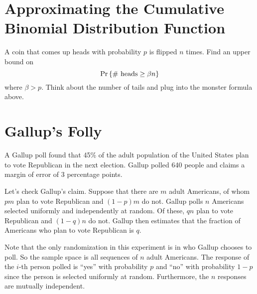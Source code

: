 \documentclass[12pt]{article}
\begin{document}
\vspace{0.5in}

\section{Approximating the Cumulative Binomial Distribution Function}
A coin that comes up heads with probability $p$ is flipped $n$ times.
Find an upper bound on
%
\[
\mathop{\textup{Pr}}\nolimits\left\{\text{\# heads} \geq \beta n\right\}
\]
%
where $\beta > p$.  Think about the number of tails and plug into the
monster formula above.



\newpage

\section{Gallup's Folly} A Gallup poll found that 45\% of the
adult population of the United States plan to vote Republican in the next election.  Gallup polled 640
people and claims a margin of error of 3 percentage points.

Let's check Gallup's claim.  Suppose that there are $m$ adult
Americans, of whom $pm$ plan to vote Republican and
$(1-p)m$ do not.  Gallup polls $n$ Americans selected uniformly and
independently at random.  Of these, $qn$ plan to vote Republican
and $(1-q)n$ do not.  Gallup then estimates that the
fraction of Americans who plan to vote Republican is $q$.

Note that the only randomization in this experiment is in who Gallup
chooses to poll.  So the sample space is all sequences of $n$ adult
Americans.  The response of the $i$-th person polled is ``yes'' with
probability $p$ and ``no'' with probability $1 - p$ since the person
is selected uniformly at random.  Furthermore, the $n$ responses are
mutually independent.
\end{document}
